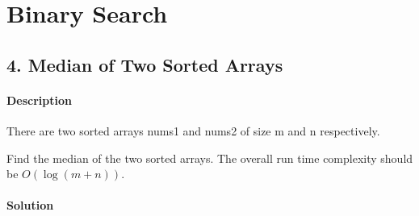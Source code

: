\section{Binary Search}

\subsection{4. Median of Two Sorted Arrays}

\paragraph{Description}

There are two sorted arrays nums1 and nums2 of size m and n respectively.

Find the median of the two sorted arrays. The overall run time complexity should be $O(\log(m+n))$.

\paragraph{Solution}

